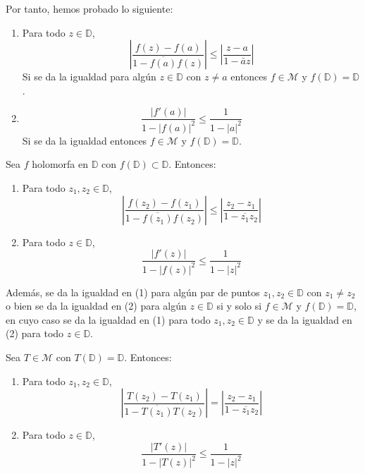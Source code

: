 Por tanto, hemos probado lo siguiente:
\begin{enumerate}
    \item Para todo $z \in \mathbb{D}$,
          $$\left|\frac{f(z)-f(a)}{1-\overline{f(a)}f(z)}\right| \leq \left|\frac{z-a}{1-\bar{a}z}\right|$$
          Si se da la igualdad para algún $z \in \mathbb{D}$ con $z \neq a$ entonces $f \in \mathcal{M}$ y $f(\mathbb{D}) = \mathbb{D}$.
    \item $$\frac{|f'(a)|}{1-|f(a)|^2} \leq \frac{1}{1-|a|^2}$$
          Si se da la igualdad entonces $f \in \mathcal{M}$ y $f(\mathbb{D}) = \mathbb{D}$.
\end{enumerate}

\begin{theorem}
    Sea $f$ holomorfa en $\mathbb{D}$ con $f(\mathbb{D}) \subset \mathbb{D}$.
    Entonces:
    \begin{enumerate}
        \item Para todo $z_1, z_2 \in \mathbb{D}$,
              $$\left|\frac{f(z_2)-f(z_1)}{1-\overline{f(z_1)}f(z_2)}\right| \leq \left|\frac{z_2-z_1}{1-\overline{z_1}z_2}\right|$$
        \item Para todo $z \in \mathbb{D}$,
              $$\frac{|f'(z)|}{1-|f(z)|^2} \leq \frac{1}{1-|z|^2}$$
    \end{enumerate}

    Además, se da la igualdad en (1) para algún par de puntos $z_1, z_2 \in \mathbb{D}$ con $z_1 \neq z_2$ o bien se da la igualdad en (2) para algún $z \in \mathbb{D}$ si y solo si $f \in \mathcal{M}$ y $f(\mathbb{D}) = \mathbb{D}$, en cuyo caso se da la igualdad en (1) para todo $z_1, z_2 \in \mathbb{D}$ y se da la igualdad en (2) para todo $z \in \mathbb{D}$.
\end{theorem}

\begin{proposition}
    Sea $T \in \mathcal{M}$ con $T(\mathbb{D}) = \mathbb{D}$.
    Entonces:
    \begin{enumerate}
        \item Para todo $z_1, z_2 \in \mathbb{D}$,
              $$\left|\frac{T(z_2)-T(z_1)}{1-\overline{T(z_1)}T(z_2)}\right| = \left|\frac{z_2-z_1}{1-\overline{z_1}z_2}\right|$$
        \item Para todo $z \in \mathbb{D}$,
              $$\frac{|T'(z)|}{1-|T(z)|^2} \leq \frac{1}{1-|z|^2}$$
    \end{enumerate}
\end{proposition}

